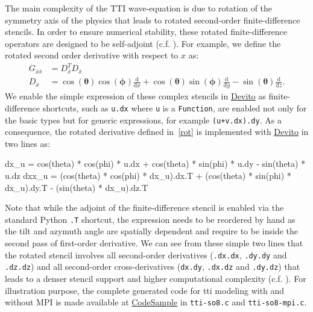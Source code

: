 \documentclass[conference]{IEEEtran}
\begin{document}
The main complexity of the TTI wave-equation is due to rotation of the
symmetry axis of the physics that leads to rotated second-order
finite-difference stencils. In order to ensure numerical stability,
these rotated finite-difference operators are designed to be
self-adjoint (c.f. \cite{zhang2011, duveneck}). For example, we define
the rotated second order derivative with respect to $x$ as:
%
\begin{equation}
\begin{aligned}
  G_{\bar{x}\bar{x}} &= D_{\bar{x}}^T D_{\bar{x}} \\
  D_{\bar{x}} &= \cos(\mathbf{\theta})\cos(\mathbf{\phi})\frac{\mathrm{d}}{\mathrm{d}x} + \cos(\mathbf{\theta})\sin(\mathbf{\phi})\frac{\mathrm{d}}{\mathrm{d}y} - \sin(\mathbf{\theta})\frac{\mathrm{d}}{\mathrm{d}z}.
\end{aligned}
\label{rot}
\end{equation}
%
 We enable the simple expression of these complex stencils in
\href{https://github.com/devitocodes/devito}{Devito} as
finite-difference shortcuts, such as \texttt{u.dx} where \texttt{u} is a
\texttt{Function}, are enabled not only for the basic types but for
generic expressions, for example
\texttt{(u\phantom{\ }+\phantom{\ }v.dx).dy}. As a consequence, the
rotated derivative defined in~\ref{rot} is implemented with
\href{https://github.com/devitocodes/devito}{Devito} in two lines as:

\begin{python}
dx_u = cos(theta) * cos(phi) * u.dx +
       cos(theta) * sin(phi) * u.dy -
       sin(theta) * u.dz
dxx_u = (cos(theta) * cos(phi) * dx_u).dx.T +
        (cos(theta) * sin(phi) * dx_u).dy.T -
        (sin(theta) * dx_u).dz.T
\end{python}

Note that while the adjoint of the finite-difference stencil is enabled
via the standard Python \texttt{.T} shortcut, the expression needs to be
reordered by hand as the tilt and azymuth angle are spatially dependent
and require to be inside the second pass of first-order derivative. We
can see from these simple two lines that the rotated stencil involves
all second-order derivatives (\texttt{.dx.dx}, \texttt{.dy.dy} and
\texttt{.dz.dz}) and all second-order cross-derivatives (\texttt{dx.dy},
\texttt{.dx.dz} and \texttt{.dy.dz}) that leads to a denser stencil
support and higher computational complexity (c.f.
\cite{louboutin2016ppf}). For illustration purpose, the complete
generated code for tti modeling with and without MPI is made available
at
\href{https://github.com/mloubout/SC20Paper/tree/master/gencode}{CodeSample}
in \texttt{tti-so8.c} and \texttt{tti-so8-mpi.c}.
\end{document}
